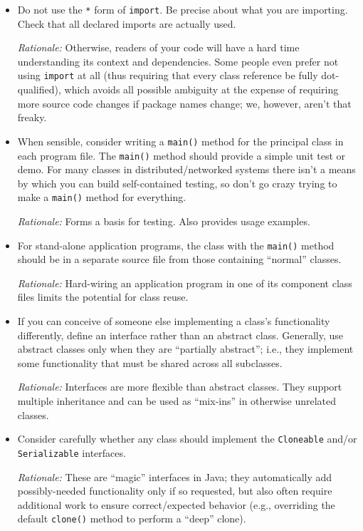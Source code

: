 \begin{itemize}
    \item
    Do not use the \texttt{*} form of \texttt{import}. Be precise about what you are importing. Check that all declared imports are actually used.
    
    \emph{Rationale:} Otherwise, readers of your code will have a hard time understanding its context and dependencies. Some people even prefer not using \texttt{import} at all (thus requiring that every class reference be fully dot-qualified), which avoids all possible ambiguity at the expense of requiring more source code changes if package names change; we, however, aren't that freaky.

    \item 
    When sensible, consider writing a \texttt{main()} method for the principal class in each program file. The \texttt{main()} method should provide a simple unit test or demo. For many classes in distributed/networked systems there isn't a means by which you can build self-contained testing, so don't go crazy trying to make a \texttt{main()} method for everything.

    \emph{Rationale:} Forms a basis for testing. Also provides usage examples.

    \item 
    For stand-alone application programs, the class with the \texttt{main()} method should be in a separate source file from those containing ``normal'' classes.
    
    \emph{Rationale:} Hard-wiring an application program in one of its component class files limits the potential for class reuse.

    \item 
    If you can conceive of someone else implementing a class's functionality differently, define an interface rather than an abstract class. Generally, use abstract classes only when they are ``partially abstract''; i.e., they implement some functionality that must be shared across all subclasses.

    \emph{Rationale:} Interfaces are more flexible than abstract classes. They support multiple inheritance and can be used as ``mix-ins'' in otherwise unrelated classes.

    \item
    Consider carefully whether any class should implement the \texttt{Cloneable} and/or \texttt{Serializable} interfaces.

    \emph{Rationale:} These are ``magic'' interfaces in Java; they automatically add possibly-needed functionality only if so requested, but also often require additional work to ensure correct/expected behavior (e.g., overriding the default \texttt{clone()} method to perform a ``deep'' clone). 


\end{itemize}

